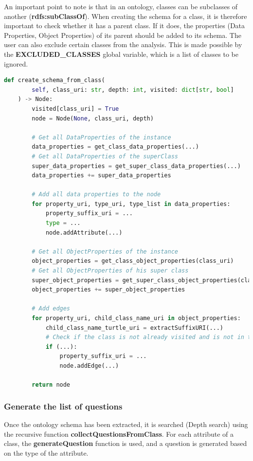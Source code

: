 An important point to note is that in an ontology, classes can be subclasses of another (\textbf{rdfs:subClassOf}). When creating the schema for a class, it is therefore important to check whether it has a parent class. If it does, the properties (Data Properties, Object Properties) of its parent should be added to its schema.
The user can also exclude certain classes from the analysis. This is made possible by the \textbf{EXCLUDED\_CLASSES} global variable, which is a list of classes to be ignored.\\

\begin{lstlisting}[language=Python, caption=Function to create the schema of the ontology, label={lst:create-schema}]
def create_schema_from_class(
        self, class_uri: str, depth: int, visited: dict[str, bool]
    ) -> Node:
        visited[class_uri] = True
        node = Node(None, class_uri, depth)

        # Get all DataProperties of the instance
        data_properties = get_class_data_properties(...)
        # Get all DataProperties of the superClass
        super_data_properties = get_super_class_data_properties(...)
        data_properties += super_data_properties

        # Add all data properties to the node
        for property_uri, type_uri, type_list in data_properties:
            property_suffix_uri = ...
            type = ...
            node.addAttribute(...)

        # Get all ObjectProperties of the instance
        object_properties = get_class_object_properties(class_uri)
        # Get all ObjectProperties of his super class
        super_object_properties = get_super_class_object_properties(class_uri)
        object_properties += super_object_properties

        # Add edges
        for property_uri, child_class_name_uri in object_properties:
            child_class_name_turtle_uri = extractSuffixURI(...)
            # Check if the class is not already visited and is not in the list of excluded classes
            if (...):
                property_suffix_uri = ...
                node.addEdge(...)

        return node
\end{lstlisting}


\subsubsection{Generate the list of questions}
Once the ontology schema has been extracted, it is searched (Depth search) using the recursive function \textbf{collectQuestionsFromClass}. For each attribute of a class, the \textbf{generateQuestion} function is used, and a question is generated based on the type of the attribute.

